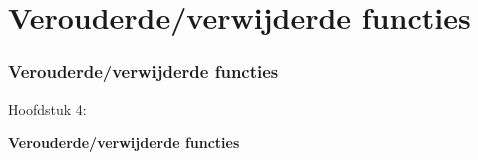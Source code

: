 %

\section{Verouderde/verwijderde functies}
\begin{frame}[fragile]
	\frametitle{Verouderde/verwijderde functies}

	\begin{center}\huge{Hoofdstuk 4:}\end{center}
	\begin{center}\huge{\color{typo3darkgrey}\textbf{Verouderde/verwijderde functies}}\end{center}

\end{frame}


